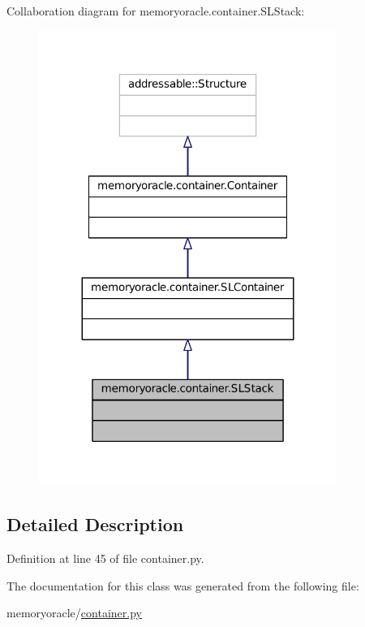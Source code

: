Collaboration diagram for memoryoracle.\+container.\+S\+L\+Stack\+:\nopagebreak
\begin{figure}[H]
\begin{center}
\leavevmode
\includegraphics[width=275pt]{classmemoryoracle_1_1container_1_1SLStack__coll__graph}
\end{center}
\end{figure}


\subsection{Detailed Description}


Definition at line 45 of file container.\+py.



The documentation for this class was generated from the following file\+:\begin{DoxyCompactItemize}
\item 
memoryoracle/\hyperlink{container_8py}{container.\+py}\end{DoxyCompactItemize}
